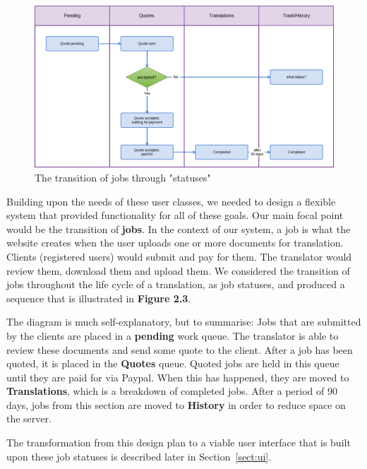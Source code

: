 \documentclass{l3proj}
\begin{document}
\begin{figure}[h]
\label{fig:jobstatuses}
\centering
\includegraphics[width=\linewidth]{jobstatuses}
\caption{The transition of jobs through "statuses"}
\end{figure}

Building upon the needs of these user classes, we needed to design a flexible
system that provided functionality for all of these goals. Our main focal point
would be the transition of \textbf{jobs}. In the context of our system, a job is
what the website creates when the user uploads one or more documents for
translation. Clients (registered users) would submit and pay for them. The
translator would review them, download them and upload them. We considered the
transition of jobs throughout the life cycle of a translation, as job statuses,
and produced a sequence that is illustrated in \textbf{Figure 2.3}. \newline

The diagram is much self-explanatory, but to summarise: Jobs that are submitted
by the clients are placed in a \textbf{pending} work queue. The translator is
able to review these documents and send some quote to the client. After a job
has been quoted, it is placed in the \textbf{Quotes} queue. Quoted jobs are held
in this queue until they are paid for via Paypal. When this has happened, they
are moved to \textbf{Translations}, which is a breakdown of completed jobs.
After a period of 90 days, jobs from this section are moved to \textbf{History}
in order to reduce space on the server.

The transformation from this design plan to a viable user interface that is
built upon these job statuses is described later in Section~\ref{sect:ui}.
\newline
\end{document}

